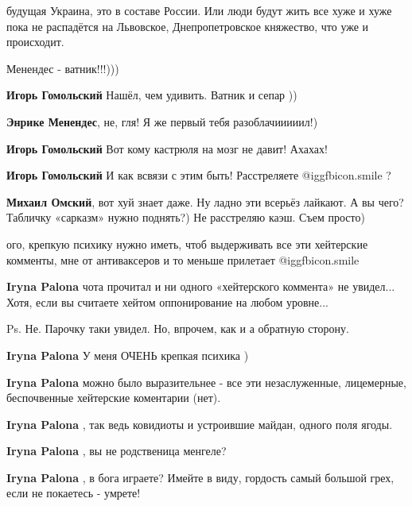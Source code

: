 \begin{itemize}
\begin{itemize}
будущая Украина, это в составе России. Или люди будут жить все хуже и хуже пока
не распадётся на Львовское, Днепропетровское
княжество, что уже и происходит.
\end{itemize} %

Менендес - ватник!!!)))

\begin{itemize} %
\textbf{Игорь Гомольский} Нашёл, чем удивить. Ватник и сепар ))

\textbf{Энрике Менендес}, не, гля! Я же первый тебя разоблачииииил!)

\textbf{Игорь Гомольский} Вот кому кастрюля на мозг не давит! Ахахах!

\textbf{Игорь Гомольский} И как всвязи с этим быть! Расстреляете  @igg{fbicon.smile} ?

\textbf{Михаил Омский}, вот хуй знает даже. Ну ладно эти всерьёз лайкают. А вы чего? Табличку «сарказм» нужно поднять?) Не расстреляю каэш. Съем просто)
\end{itemize} %


ого, крепкую психику нужно иметь, чтоб выдерживать все эти хейтерские комменты,
мне от антиваксеров и то меньше прилетает  @igg{fbicon.smile} 

\begin{itemize} %
\textbf{Iryna Palona} чота прочитал и ни одного «хейтерского коммента» не увидел... Хотя, если вы считаете хейтом оппонирование на любом уровне...

Ps. Не. Парочку таки увидел. Но, впрочем, как и а обратную сторону.


\textbf{Iryna Palona} У меня ОЧЕНЬ крепкая психика )

\textbf{Iryna Palona} можно было выразительнее - все эти незаслуженные, лицемерные, беспочвенные хейтерские коментарии (нет).

\textbf{Iryna Palona} , так ведь ковидиоты и устроившие майдан, одного поля ягоды.

\textbf{Iryna Palona} , вы не родственица менгеле?

\textbf{Iryna Palona} , в бога играете? Имейте в виду, гордость самый большой грех, если не покаетесь - умрете!
\end{itemize} %


\end{itemize}
